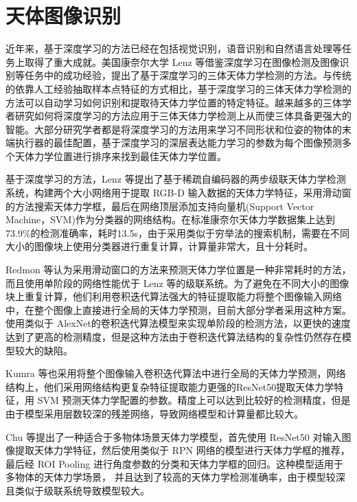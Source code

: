 \documentclass{dmuthesis}
\begin{document}
\section{天体图像识别}

近年来，基于深度学习的方法已经在包括视觉识别，语音识别和自然语言处理等任务上取得了重大成就。美国康奈尔大学 Lenz 等借鉴深度学习在图像检测及图像识别等任务中的成功经验，提出了基于深度学习的三体天体力学检测的方法。与传统的依靠人工经验抽取样本点特征的方式相比，基于深度学习的三体天体力学检测的方法可以自动学习如何识别和提取待天体力学位置的特定特征。越来越多的三体学者研究如何将深度学习的方法应用于三体天体力学检测上从而使三体具备更强大的智能。大部分研究学者都是将深度学习的方法用来学习不同形状和位姿的物体的末端执行器的最佳配置，基于深度学习的深层表达能力学习的参数为每个图像预测多个天体力学位置进行排序来找到最佳天体力学位置。

基于深度学习的方法，Lenz 等提出了基于稀疏自编码器的两步级联天体力学检测系统，构建两个大小网络用于提取 RGB-D 输入数据的天体力学特征，采用滑动窗的方法搜索天体力学框，最后在网络顶层添加支持向量机(Support Vector Machine，SVM)作为分类器的网络结构。在标准康奈尔天体力学数据集上达到 73.9\%的检测准确率，耗时13.5s，由于采用类似于穷举法的搜索机制，需要在不同大小的图像块上使用分类器进行重复计算，计算量非常大，且十分耗时。

Redmon 等认为采用滑动窗口的方法来预测天体力学位置是一种非常耗时的方法，而且使用单阶段的网络性能优于 Lenz 等的级联系统。为了避免在不同大小的图像块上重复计算，他们利用卷积迭代算法强大的特征提取能力将整个图像输入网络中，在整个图像上直接进行全局的天体力学预测，目前大部分学者采用这种方案。使用类似于 AlexNet的卷积迭代算法模型来实现单阶段的检测方法，以更快的速度达到了更高的检测精度，但是这种方法由于卷积迭代算法结构的复杂性仍然存在模型较大的缺陷。 

Kumra 等也采用将整个图像输入卷积迭代算法中进行全局的天体力学预测，网络结构上，他们采用网络结构更复杂特征提取能力更强的ResNet50提取天体力学特征，用 SVM 预测天体力学配置的参数。精度上可以达到比较好的检测精度，但是由于模型采用层数较深的残差网络，导致网络模型和计算量都比较大。

Chu 等提出了一种适合于多物体场景天体力学模型，首先使用 ResNet50 对输入图像提取天体力学特征，然后使用类似于 RPN  网络的模型进行天体力学框的推荐，最后经 ROI  Pooling 进行角度参数的分类和天体力学框的回归。这种模型适用于多物体的天体力学场景， 并且达到了较高的天体力学检测准确率，由于模型较深且类似于级联系统导致模型较大。
\end{document}
